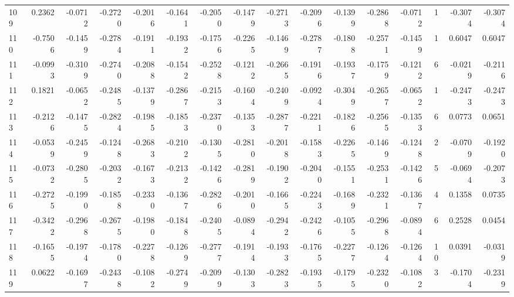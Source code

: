 \begin{tabular}{lrrrrrrrrrrrrrrr}
109 &      0.2362 & -0.0712 & -0.2720 & -0.2016 & -0.1641 & -0.2050 & -0.1479 & -0.2713 & -0.2096 & -0.1399 &  -0.2868 &    -0.0712 &      1 &                   -0.3074 &                    -0.3074 \\
110 &     -0.7506 & -0.1459 & -0.2784 & -0.1911 & -0.1932 & -0.1756 & -0.2265 & -0.1469 & -0.2787 & -0.1808 &  -0.2571 &    -0.1459 &      1 &                    0.6047 &                     0.6047 \\
111 &     -0.0993 & -0.3109 & -0.2740 & -0.2088 & -0.1542 & -0.2528 & -0.1212 & -0.2665 & -0.1916 & -0.1937 &  -0.1759 &    -0.1212 &      6 &                   -0.0219 &                    -0.2116 \\
112 &      0.1821 & -0.0652 & -0.2485 & -0.1379 & -0.2867 & -0.2153 & -0.1604 & -0.2409 & -0.0924 & -0.3049 &  -0.2657 &    -0.0652 &      1 &                   -0.2473 &                    -0.2473 \\
113 &     -0.2126 & -0.1475 & -0.2824 & -0.1985 & -0.1853 & -0.2370 & -0.1353 & -0.2877 & -0.2211 & -0.1826 &  -0.2565 &    -0.1353 &      6 &                    0.0773 &                     0.0651 \\
114 &     -0.0539 & -0.2459 & -0.1248 & -0.2683 & -0.2102 & -0.1305 & -0.2810 & -0.2018 & -0.1583 & -0.2265 &  -0.1469 &    -0.1248 &      2 &                   -0.0709 &                    -0.1920 \\
115 &     -0.0732 & -0.2805 & -0.2032 & -0.1673 & -0.2132 & -0.1426 & -0.2819 & -0.1902 & -0.2040 & -0.1551 &  -0.2531 &    -0.1426 &      5 &                   -0.0694 &                    -0.2073 \\
116 &     -0.2725 & -0.1990 & -0.1858 & -0.2330 & -0.1367 & -0.2826 & -0.2010 & -0.1665 & -0.2243 & -0.1689 &  -0.2321 &    -0.1367 &      4 &                    0.1358 &                     0.0735 \\
117 &     -0.3422 & -0.2968 & -0.2675 & -0.1980 & -0.1848 & -0.2405 & -0.0894 & -0.2942 & -0.2426 & -0.1055 &  -0.2968 &    -0.0894 &      6 &                    0.2528 &                     0.0454 \\
118 &     -0.1655 & -0.1974 & -0.1780 & -0.2278 & -0.1269 & -0.2777 & -0.1914 & -0.1933 & -0.1765 & -0.2277 &  -0.1264 &    -0.1264 &     10 &                    0.0391 &                    -0.0319 \\
119 &      0.0622 & -0.1697 & -0.2438 & -0.1082 & -0.2749 & -0.2099 & -0.1303 & -0.2823 & -0.1935 & -0.1795 &  -0.2320 &    -0.1082 &      3 &                   -0.1704 &                    -0.2319 \\

\end{tabular}
